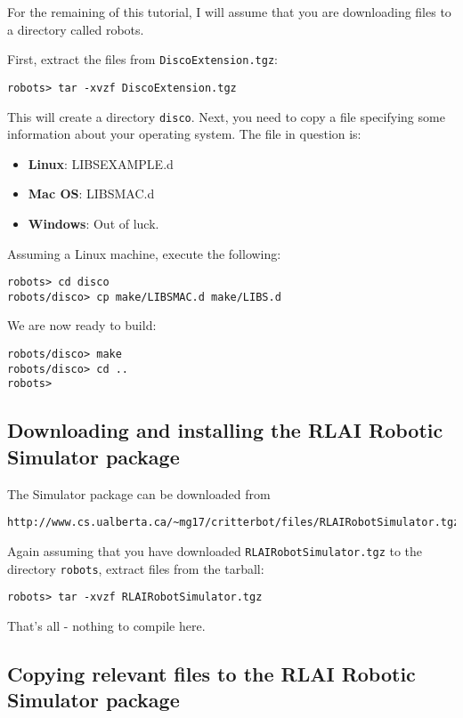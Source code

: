 \documentclass[12pt]{article}
\begin{document}
For the remaining of this tutorial, I will assume that you are downloading
files to a directory called robots.

First, extract the files from \verb+DiscoExtension.tgz+:

\begin{verbatim}robots> tar -xvzf DiscoExtension.tgz \end{verbatim}

This will create a directory \verb+disco+. Next, you need to copy a file 
specifying some information about your operating system. The file in question 
is:

\begin{itemize}
\item{\textbf{Linux}: LIBSEXAMPLE.d}
\item{\textbf{Mac OS}: LIBSMAC.d}
\item{\textbf{Windows}: Out of luck.}
\end{itemize}

Assuming a Linux machine, execute the following:

\begin{verbatim}
robots> cd disco
robots/disco> cp make/LIBSMAC.d make/LIBS.d
\end{verbatim}

We are now ready to build:
\begin{verbatim}
robots/disco> make
robots/disco> cd ..
robots>
\end{verbatim}

\subsection{Downloading and installing the RLAI Robotic Simulator package}

The Simulator package can be downloaded from

\begin{verbatim}
http://www.cs.ualberta.ca/~mg17/critterbot/files/RLAIRobotSimulator.tgz
\end{verbatim}

Again assuming that you have downloaded \verb+RLAIRobotSimulator.tgz+ to
the directory \verb+robots+, extract files from the tarball:

\begin{verbatim}robots> tar -xvzf RLAIRobotSimulator.tgz \end{verbatim}

That's all - nothing to compile here.

\subsection{Copying relevant files to the RLAI Robotic Simulator package}
\end{document}
